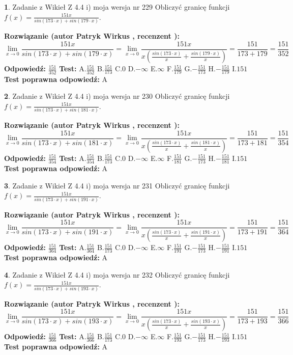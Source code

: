 \documentclass[12pt, a4paper]{article}
\theoremstyle{definition} %
\newtheorem{zad}{}
\newcommand{\zadStart}[1]{\begin{zad}#1\newline}
\newcommand{\zadStop}{\end{zad}}
\newcommand{\rozwStart}[2]{\noindent \textbf{Rozwiązanie (autor #1 , recenzent #2): }\newline}
\newcommand{\rozwStop}{\newline}
\newcommand{\odpStart}{\noindent \textbf{Odpowiedź:}\newline}
\newcommand{\odpStop}{\newline}
\newcommand{\testStart}{\noindent \textbf{Test:}\newline}
\newcommand{\testStop}{\newline}
\newcommand{\kluczStart}{\noindent \textbf{Test poprawna odpowiedź:}\newline}
\newcommand{\kluczStop}{\newline}
\begin{document}
\zadStart{Zadanie z Wikieł Z 4.4 i) moja wersja nr 229}
Obliczyć granicę funkcji $f(x)=\frac{151x}{sin(173\cdot x) +sin(179\cdot x)}$.
\zadStop
\rozwStart{Patryk Wirkus}{}
$$\lim\limits_{x\to 0}\frac{151x}{sin(173\cdot x) +sin(179\cdot x)}=\lim\limits_{x\to 0}\frac{151x}{x(\frac{sin(173\cdot x)}{x}+\frac{sin(179\cdot x)}{x})}=\frac{151}{173+179} = \frac{151}{352}$$
\rozwStop
\odpStart
$\frac{151}{352}$
\odpStop
\testStart
A.$\frac{151}{352}$
B.$\frac{151}{173}$
C.$0$
D.$-\infty$
E.$\infty$
F.$\frac{151}{179}$
G.$-\frac{151}{173}$
H.$-\frac{151}{179}$
I.$151$
\testStop
\kluczStart
A
\kluczStop



\zadStart{Zadanie z Wikieł Z 4.4 i) moja wersja nr 230}
Obliczyć granicę funkcji $f(x)=\frac{151x}{sin(173\cdot x) +sin(181\cdot x)}$.
\zadStop
\rozwStart{Patryk Wirkus}{}
$$\lim\limits_{x\to 0}\frac{151x}{sin(173\cdot x) +sin(181\cdot x)}=\lim\limits_{x\to 0}\frac{151x}{x(\frac{sin(173\cdot x)}{x}+\frac{sin(181\cdot x)}{x})}=\frac{151}{173+181} = \frac{151}{354}$$
\rozwStop
\odpStart
$\frac{151}{354}$
\odpStop
\testStart
A.$\frac{151}{354}$
B.$\frac{151}{173}$
C.$0$
D.$-\infty$
E.$\infty$
F.$\frac{151}{181}$
G.$-\frac{151}{173}$
H.$-\frac{151}{181}$
I.$151$
\testStop
\kluczStart
A
\kluczStop



\zadStart{Zadanie z Wikieł Z 4.4 i) moja wersja nr 231}
Obliczyć granicę funkcji $f(x)=\frac{151x}{sin(173\cdot x) +sin(191\cdot x)}$.
\zadStop
\rozwStart{Patryk Wirkus}{}
$$\lim\limits_{x\to 0}\frac{151x}{sin(173\cdot x) +sin(191\cdot x)}=\lim\limits_{x\to 0}\frac{151x}{x(\frac{sin(173\cdot x)}{x}+\frac{sin(191\cdot x)}{x})}=\frac{151}{173+191} = \frac{151}{364}$$
\rozwStop
\odpStart
$\frac{151}{364}$
\odpStop
\testStart
A.$\frac{151}{364}$
B.$\frac{151}{173}$
C.$0$
D.$-\infty$
E.$\infty$
F.$\frac{151}{191}$
G.$-\frac{151}{173}$
H.$-\frac{151}{191}$
I.$151$
\testStop
\kluczStart
A
\kluczStop



\zadStart{Zadanie z Wikieł Z 4.4 i) moja wersja nr 232}
Obliczyć granicę funkcji $f(x)=\frac{151x}{sin(173\cdot x) +sin(193\cdot x)}$.
\zadStop
\rozwStart{Patryk Wirkus}{}
$$\lim\limits_{x\to 0}\frac{151x}{sin(173\cdot x) +sin(193\cdot x)}=\lim\limits_{x\to 0}\frac{151x}{x(\frac{sin(173\cdot x)}{x}+\frac{sin(193\cdot x)}{x})}=\frac{151}{173+193} = \frac{151}{366}$$
\rozwStop
\odpStart
$\frac{151}{366}$
\odpStop
\testStart
A.$\frac{151}{366}$
B.$\frac{151}{173}$
C.$0$
D.$-\infty$
E.$\infty$
F.$\frac{151}{193}$
G.$-\frac{151}{173}$
H.$-\frac{151}{193}$
I.$151$
\testStop
\kluczStart
A
\kluczStop
\end{document}
